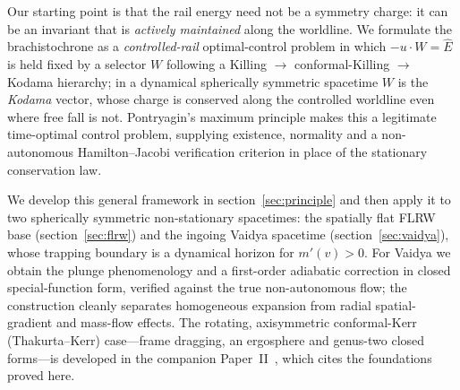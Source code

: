 \documentclass[12pt]{iopart}
\newcommand{\Ehat}{\hat E}
\theoremstyle{plain}
\theoremstyle{definition}
\theoremstyle{plain}
\theoremstyle{remark}
\begin{document}
Our starting point is that the rail energy need not be a symmetry charge: it can be an
invariant that is \emph{actively maintained} along the worldline. We formulate the
brachistochrone as a \emph{controlled-rail} optimal-control problem in which
$-u\cdot W=\Ehat$ is held fixed by a selector $W$ following a Killing $\to$
conformal-Killing $\to$ Kodama hierarchy; in a dynamical spherically symmetric spacetime
$W$ is the \emph{Kodama} vector, whose charge is conserved along the controlled worldline
even where free fall is not. Pontryagin's maximum principle makes this a legitimate
time-optimal control problem, supplying existence, normality and a non-autonomous
Hamilton--Jacobi verification criterion in place of the stationary conservation law.

We develop this general framework in section~\ref{sec:principle} and then apply it to two
spherically symmetric non-stationary spacetimes: the spatially flat FLRW base
(section~\ref{sec:flrw}) and the ingoing Vaidya spacetime
(section~\ref{sec:vaidya}), whose trapping boundary is a dynamical horizon for
$m'(v)>0$. For Vaidya we obtain the plunge phenomenology and a
first-order adiabatic correction in closed special-function form, verified against the
true non-autonomous flow; the construction cleanly separates homogeneous expansion from
radial spatial-gradient and mass-flow effects. The rotating, axisymmetric conformal-Kerr
(Thakurta--Kerr) case---frame dragging, an ergosphere and genus-two closed forms---is
developed in the companion Paper~II~\cite{PaperTwo}, which cites the foundations proved
here.
\end{document}
